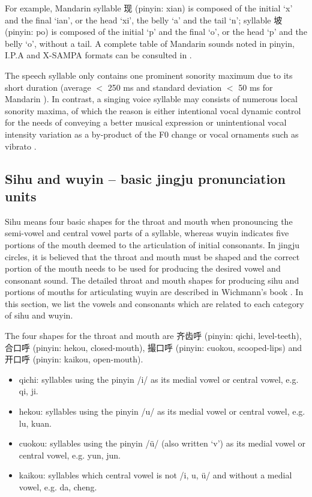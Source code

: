 For example, Mandarin syllable 现 (pinyin: xian) is composed of the initial `x' and the final `ian', or the head `xi', the belly `a' and the tail `n'; syllable 坡 (pinyin: po) is composed of the initial `p' and the final `o', or the head `p' and the belly `o', without a tail. A complete table of Mandarin sounds noted in pinyin, I.P.A and X-SAMPA formats can be consulted in .

The speech syllable only contains one prominent sonority maximum due to its short duration (average $<$ 250 ms and standard deviation $<$ 50 ms for Mandarin \cite{wang_syllable_1994}). In contrast, a singing voice syllable may consists of numerous local sonority maxima, of which the reason is either intentional vocal dynamic control for the needs of conveying a better musical expression or unintentional vocal intensity variation as a by-product of the F0 change \cite{titze_vocal_1992} or vocal ornaments such as vibrato \cite{horii_note_1988}.

\subsection{Sihu and wuyin -- basic jingju pronunciation units}\label{sec:ch2:sihu_wuyin}

Sihu means four basic shapes for the throat and mouth when pronouncing the semi-vowel and central vowel parts of a syllable, whereas wuyin indicates five portions of the mouth deemed to the articulation of initial consonants. In jingju circles, it is believed that the throat and mouth must be shaped and the correct portion of the mouth needs to be used for producing the desired vowel and consonant sound. The detailed throat and mouth shapes for producing sihu and portions of mouths for articulating wuyin are described in Wichmann's book \cite{Wichmann1991a}. In this section, we list the vowels and consonants which are related to each category of sihu and wuyin.

The four shapes for the throat and mouth are 齐齿呼 (pinyin: qichi, level-teeth), 合口呼 (pinyin: hekou, closed-mouth), 撮口呼 (pinyin: cuokou, scooped-lips) and 开口呼 (pinyin: kaikou, open-mouth). 
\begin{itemize}[itemsep=0pt]
\item qichi: syllables using the pinyin /i/ as its medial vowel or central vowel, e.g. qi, ji.
\item hekou: syllables using the pinyin /u/ as its medial vowel or central vowel, e.g. lu, kuan.
\item cuokou: syllables using the pinyin /ü/ (also written `v') as its medial vowel or central vowel, e.g. yun, jun.
\item kaikou: syllables which central vowel is not /i, u, ü/ and without a medial vowel, e.g. da, cheng.
\end{itemize}

